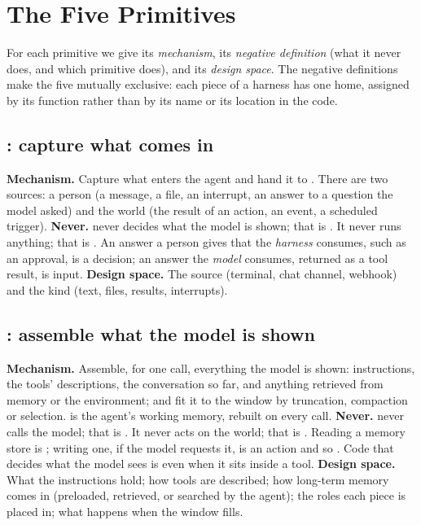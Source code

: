 \section{The Five Primitives}
\label{sec:primitives}
For each primitive we give its \emph{mechanism}, its \emph{negative definition} (what it never does, and which primitive does), and its \emph{design space}. The negative definitions make the five mutually exclusive: each piece of a harness has one home, assigned by its function rather than by its name or its location in the code.

\subsection{: capture what comes in}
\textbf{Mechanism.} Capture what enters the agent and hand it to . There are two sources: a person (a message, a file, an interrupt, an answer to a question the model asked) and the world (the result of an action, an event, a scheduled trigger).
\textbf{Never.}  never decides what the model is shown; that is . It never runs anything; that is . An answer a person gives that the \emph{harness} consumes, such as an approval, is a  decision; an answer the \emph{model} consumes, returned as a tool result, is input.
\textbf{Design space.} The source (terminal, chat channel, webhook) and the kind (text, files, results, interrupts).

\subsection{: assemble what the model is shown}
\textbf{Mechanism.} Assemble, for one call, everything the model is shown: instructions, the tools' descriptions, the conversation so far, and anything retrieved from memory or the environment; and fit it to the window by truncation, compaction or selection.  is the agent's working memory, rebuilt on every call.
\textbf{Never.}  never calls the model; that is . It never acts on the world; that is . Reading a memory store is ; writing one, if the model requests it, is an action and so . Code that decides what the model sees is  even when it sits inside a tool.
\textbf{Design space.} What the instructions hold; how tools are described; how long-term memory comes in (preloaded, retrieved, or searched by the agent); the roles each piece is placed in; what happens when the window fills.

